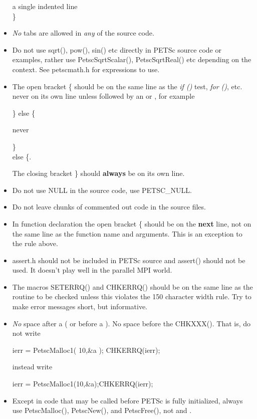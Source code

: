 \documentclass[twoside,12pt]{../sty/report_petsc}
\begin{document}
\begin{itemize}
\begin{tabbing}
     \>a single indented line\\
   \}
\end{tabbing}
\item {\em No} tabs are allowed in {\em any} of the source code.
\item Do not use sqrt(), pow(), sin() etc directly in PETSc source code or examples, rather use PetscSqrtScalar(), PetscSqrtReal() etc depending on the context. See petscmath.h for expressions to use.
\item The open bracket \{ should be on the same line as the {\em if ()} test, {\em for ()}, etc. never on
      its own line unless followed by an  or , for example
\begin{tabbing}
   \} else \{ \\
\end{tabbing}
never
\begin{tabbing}
   \} \\
   else \{.
\end{tabbing}
 The closing bracket \} should {\bf always} be on its own line.
\item Do not use NULL in the source code, use PETSC\_NULL.
\item Do not leave chunks of commented out code in the source files.
\item In function declaration the open bracket \{ should be on the {\bf next} line, not on the same line as the function name and
      arguments. This is an exception to the rule above.
\item assert.h should not be included in PETSc source and assert() should not be used. It doesn't play well in the parallel MPI world.
\item The macros SETERRQ() and CHKERRQ() should be on the
      same line as the routine to be checked unless this violates the
      150 character width rule. Try to make error messages short, but
      informative.
\item {\em No} space after a ( or before a ). No space before the CHKXXX(). That is, do not write
\begin{tabbing}
   ierr = PetscMalloc1( 10,\&a ); CHKERRQ(ierr);
\end{tabbing}
instead write
\begin{tabbing}
   ierr = PetscMalloc1(10,\&a);CHKERRQ(ierr);
\end{tabbing}
\item Except in code that may be called before PETSc is fully initialized, always use PetscMalloc(), PetscNew(), and PetscFree(), not  and .

\end{itemize}
\end{document}
